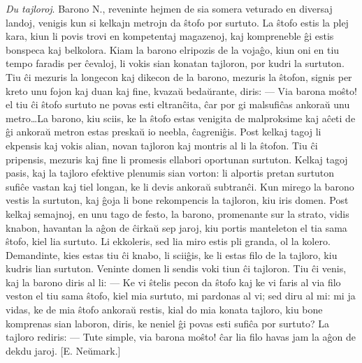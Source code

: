 \emph{Du tajloroj}. Barono N., reveninte hejmen de sia somera
veturado en diversaj landoj, venigis kun si kelkajn metrojn da
\^stofo por surtuto. La \^stofo estis la plej kara, kiun li povis
trovi en kompetentaj magazenoj, kaj kompreneble \^gi estis bonspeca
kaj belkolora. Kiam la barono elripozis de la voja\^go, kiun oni en
tiu tempo faradis per \^cevaloj, li vokis sian konatan tajloron, por
kudri la surtuton. Tiu \^ci mezuris la longecon kaj dikecon de la
barono, mezuris la \^stofon, signis per kreto unu fojon kaj duan kaj
fine, kvaza\u u beda\u urante, diris: --- Via barona mo\^sto! el tiu
\^ci \^stofo surtuto ne povas esti eltran\^cita, \^car por gi
malsufi\^cas ankora\u u unu metro\dots La barono, kiu sciis, ke la
\^stofo estas venigita de malproksime kaj a\^ceti de \^gi ankora\u u
metron estas preska\u u io neebla, \^cagreni\^gis. Post kelkaj tagoj
li ekpensis kaj vokis alian, novan tajloron kaj montris al li la
\^stofon. Tiu \^ci pripensis, mezuris kaj fine li promesis ellabori
oportunan surtuton. Kelkaj tagoj pasis, kaj la tajloro efektive
plenumis sian vorton: li alportis pretan surtuton sufi\^ce vastan
kaj tiel longan, ke li devis ankora\u u subtran\^ci. Kun mirego la
barono vestis la surtuton, kaj \^goja li bone rekompencis la
tajloron, kiu iris domen. Post kelkaj semajnoj, en unu tago de
festo, la barono, promenante sur la strato, vidis knabon, havantan
la a\^gon de \^cirka\u u sep jaroj, kiu portis manteleton el tia
sama \^stofo, kiel lia surtuto. Li ekkoleris, sed lia miro estis pli
granda, ol la kolero. Demandinte, kies estas tiu \^ci knabo, li
scii\^gis, ke li estas filo de la tajloro, kiu kudris lian surtuton.
Veninte domen li sendis voki tiun \^ci tajloron. Tiu \^ci venis, kaj
la barono diris al li: --- Ke vi \^stelis pecon da \^stofo kaj ke vi
faris al via filo veston el tiu sama \^stofo, kiel mia surtuto, mi
pardonas al vi; sed diru al mi: mi ja vidas, ke de mia \^stofo
ankora\u u restis, kial do mia konata tajloro, kiu bone komprenas
sian laboron, diris, ke neniel \^gi povas esti sufi\^ca por surtuto?
La tajloro rediris: --- Tute simple, via barona mo\^sto! \^car lia
filo havas jam la a\^gon de dekdu jaroj. [E. Ne\u umark.]

